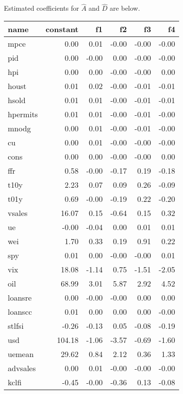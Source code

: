 \documentclass[11pt, letterpaper]{article}\usepackage[]{graphicx}\usepackage[]{color}
\begin{document}
Estimated coefficients for $\widehat{A}$ and $\widehat{D}$ are below.
\begin{table}[H]
\centering
\begingroup\footnotesize
\begin{tabular}{lrrrrr}
  \hline
name & constant & f1 & f2 & f3 & f4 \\ 
  \hline
mpce & 0.00 & 0.01 & -0.00 & -0.00 & -0.00 \\ 
  pid & 0.00 & -0.00 & 0.00 & -0.00 & -0.00 \\ 
  hpi & 0.00 & 0.00 & -0.00 & -0.00 & 0.00 \\ 
  houst & 0.01 & 0.02 & -0.00 & -0.01 & -0.01 \\ 
  hsold & 0.01 & 0.01 & -0.00 & -0.01 & -0.01 \\ 
  hpermits & 0.01 & 0.01 & -0.00 & -0.01 & -0.00 \\ 
  mnodg & 0.00 & 0.01 & -0.00 & -0.01 & -0.00 \\ 
  cu & 0.00 & 0.01 & -0.00 & -0.00 & -0.00 \\ 
  cons & 0.00 & 0.00 & -0.00 & -0.00 & 0.00 \\ 
  ffr & 0.58 & -0.00 & -0.17 & 0.19 & -0.18 \\ 
  t10y & 2.23 & 0.07 & 0.09 & 0.26 & -0.09 \\ 
  t01y & 0.69 & -0.00 & -0.19 & 0.22 & -0.20 \\ 
  vsales & 16.07 & 0.15 & -0.64 & 0.15 & 0.32 \\ 
  ue & -0.00 & -0.04 & 0.00 & 0.01 & 0.01 \\ 
  wei & 1.70 & 0.33 & 0.19 & 0.91 & 0.22 \\ 
  spy & 0.01 & 0.00 & -0.00 & -0.00 & 0.01 \\ 
  vix & 18.08 & -1.14 & 0.75 & -1.51 & -2.05 \\ 
  oil & 68.99 & 3.01 & 5.87 & 2.92 & 4.52 \\ 
  loansre & 0.00 & -0.00 & -0.00 & 0.00 & 0.00 \\ 
  loanscc & 0.01 & 0.00 & 0.00 & 0.00 & -0.00 \\ 
  stlfsi & -0.26 & -0.13 & 0.05 & -0.08 & -0.19 \\ 
  usd & 104.18 & -1.06 & -3.57 & -0.69 & -1.60 \\ 
  uemean & 29.62 & 0.84 & 2.12 & 0.36 & 1.33 \\ 
  advsales & 0.00 & 0.01 & -0.00 & -0.00 & -0.00 \\ 
  kclfi & -0.45 & -0.00 & -0.36 & 0.13 & -0.08 \\ 

\end{tabular}
\end{table}
\end{document}
